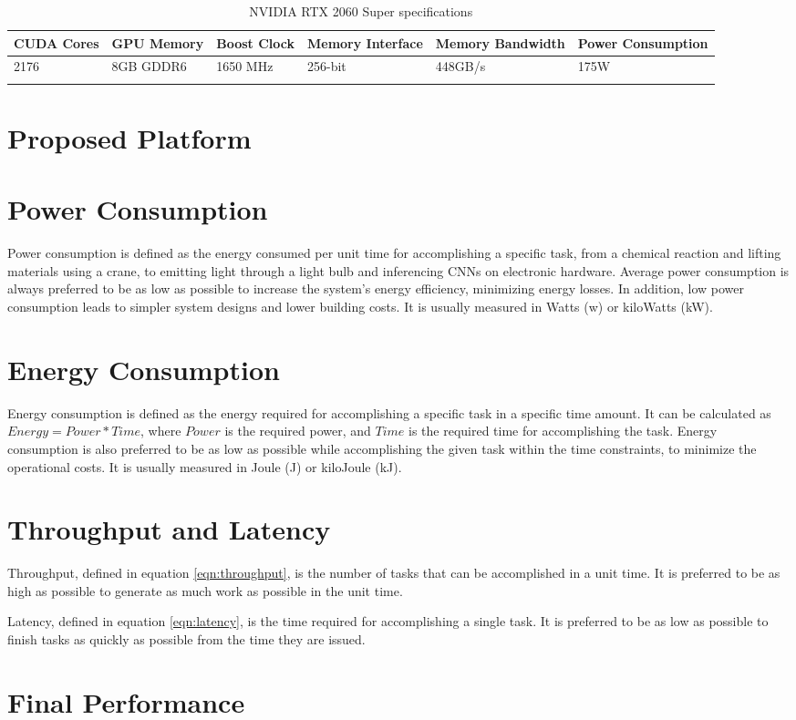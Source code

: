 \begin{table}[H]
	\caption{NVIDIA RTX 2060 Super specifications}
	\label{tab:NVIDIA-RTX-2060-Super-specs}
	\centering
	\begin{tabular}{p{1cm} p{2cm} p{1cm} p{2cm} p{2.5cm} p{2.5cm}}
		\toprule
		\textbf{CUDA Cores} & \textbf{GPU Memory} & \textbf{Boost Clock} & \textbf{Memory Interface} & \textbf{Memory Bandwidth} & \textbf{Power Consumption}\\
		\midrule
			2176 & 8GB GDDR6 & 1650 MHz & 256-bit & 448GB/s & 175W\\
		\bottomrule\\
	\end{tabular}
\end{table}

\section{Proposed Platform}
\label{sec:proposed-platform-implementation}


\section{Power Consumption}
Power consumption is defined as the energy consumed per unit time for accomplishing a specific task, from a chemical reaction and lifting materials using a crane, to emitting light through a light bulb and inferencing CNNs on electronic hardware. Average power consumption is always preferred to be as low as possible to increase the system's energy efficiency, minimizing energy losses. In addition, low power consumption leads to simpler system designs and lower building costs. It is usually measured in Watts (w) or kiloWatts (kW).

\section{Energy Consumption}
Energy consumption is defined as the energy required for accomplishing a specific task in a specific time amount. It can be calculated as $Energy = Power * Time$, where $Power$ is the required power, and $Time$ is the required time for accomplishing the task. Energy consumption is also preferred to be as low as possible while accomplishing the given task within the time constraints, to minimize the operational costs. It is usually measured in Joule (J) or kiloJoule (kJ).

\section{Throughput and Latency}
Throughput, defined in equation \ref{eqn:throughput}, is the number of tasks that can be accomplished in a unit time. It is preferred to be as high as possible to generate as much work as possible in the unit time.

Latency, defined in equation \ref{eqn:latency}, is the time required for accomplishing a single task. It is preferred to be as low as possible to finish tasks as quickly as possible from the time they are issued.

\section{Final Performance}
